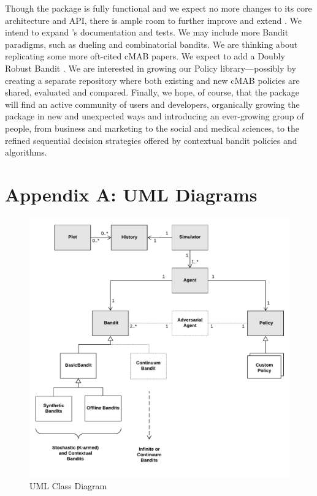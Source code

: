\documentclass{jss}\usepackage[]{graphicx}\usepackage[]{color}
\begin{document}
Though the package is fully functional and we expect no more changes to its core architecture and API, there is ample room to further improve and extend . We intend to expand 's documentation and tests. We may include more Bandit paradigms, such as dueling and combinatorial bandits. We are thinking about replicating some more oft-cited cMAB papers. We expect to add a Doubly Robust Bandit \citep{Dudik2011}. We are interested in growing our Policy library---possibly by creating a separate repository where both existing and new cMAB policies are shared, evaluated and compared. Finally, we hope, of course, that the package will find an active community of users and developers, organically growing the package in new and unexpected ways and introducing an ever-growing group of people, from business and marketing to the social and medical sciences, to the refined sequential decision strategies offered by contextual bandit policies and algorithms.


%


\newpage

\section{Appendix A: UML Diagrams}

\begin{figure}[H]
  \centering
    \includegraphics[width=.99\textwidth]{fig/contextual_class}

      \caption{ UML Class Diagram}
          \label{fig:contextual_class}
\end{figure}
\end{document}
